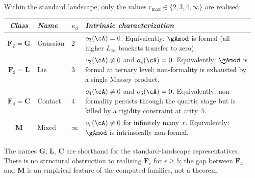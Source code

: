 \begin{definition}
Within the standard landscape, only the values
$r_{\max} \in \{2, 3, 4, \infty\}$ are realised:
\begin{center}
\small
\renewcommand{\arraystretch}{1.15}
\begin{tabular}{clll}
\toprule
\emph{Class} & \emph{Name} & $\kappa_d$ &
\emph{Intrinsic characterization} \\
\midrule
$\mathbf{F}_2 = \mathbf{G}$ & Gaussian &
  $2$ &
  \begin{minipage}[t]{0.42\textwidth}\raggedright
  $o_3(\cA) = 0$.  Equivalently: $\gAmod$ is formal
  (all higher $L_\infty$ brackets transfer to zero).
  \end{minipage} \\[6pt]
$\mathbf{F}_3 = \mathbf{L}$ & Lie &
  $3$ &
  \begin{minipage}[t]{0.42\textwidth}\raggedright
  $o_3(\cA) \neq 0$ and $o_4(\cA) = 0$.  Equivalently:
  $\gAmod$ is formal at ternary level; non-formality
  is exhausted by a single Massey product.
  \end{minipage} \\[6pt]
$\mathbf{F}_4 = \mathbf{C}$ & Contact &
  $4$ &
  \begin{minipage}[t]{0.42\textwidth}\raggedright
  $o_4(\cA) \neq 0$ and $o_5(\cA) = 0$.  Equivalently:
  non-formality persists through the quartic stage
  but is killed by a rigidity constraint at arity~$5$.
  \end{minipage} \\[6pt]
$\mathbf{M}$ & Mixed &
  $\infty$ &
  \begin{minipage}[t]{0.42\textwidth}\raggedright
  $o_r(\cA) \neq 0$ for infinitely many~$r$.
  Equivalently: $\gAmod$ is intrinsically non-formal.
  \end{minipage} \\
\bottomrule
\end{tabular}
\end{center}
The names $\mathbf{G}$, $\mathbf{L}$, $\mathbf{C}$ are
shorthand for the standard-landscape representatives.
There is no structural obstruction to realising
$\mathbf{F}_r$ for $r \geq 5$; the gap between
$\mathbf{F}_4$ and $\mathbf{M}$ is an empirical feature
of the computed families, not a theorem.
\end{definition}


